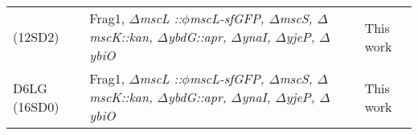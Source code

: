 \begin{longtable}[]{@{}lll@{}}
\begin{minipage}[t]{0.16\columnwidth}
(12SD2)\strut
\end{minipage}
&
\begin{minipage}[t]{0.63\columnwidth}\raggedright\strut
Frag1,
\emph{\(\Delta\)mscL
::\(\phi\)mscL-sfGFP,
\(\Delta\)mscS,
\(\Delta\)mscK::kan,
\(\Delta\)ybdG::apr,
\(\Delta\)ynaI,
\(\Delta\)yjeP,
\(\Delta\)ybiO}\strut
\end{minipage}
&
\begin{minipage}[t]{0.13\columnwidth}\raggedright\strut
This
work\strut
\end{minipage}\tabularnewline
\begin{minipage}[t]{0.16\columnwidth}\raggedright\strut
D6LG
(16SD0)\strut
\end{minipage}
&
\begin{minipage}[t]{0.63\columnwidth}\raggedright\strut
Frag1,
\emph{\(\Delta\)mscL
::\(\phi\)mscL-sfGFP,
\(\Delta\)mscS,
\(\Delta\)mscK::kan,
\(\Delta\)ybdG::apr,
\(\Delta\)ynaI,
\(\Delta\)yjeP,
\(\Delta\)ybiO}\strut
\end{minipage}
&
\begin{minipage}[t]{0.13\columnwidth}\raggedright\strut
This
work\strut
\end{minipage}\tabularnewline
\bottomrule
\end{longtable}

